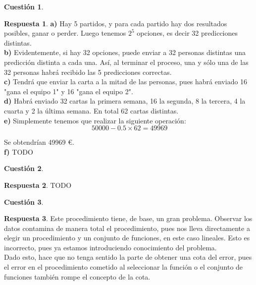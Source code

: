 \documentclass[10pt,a4paper]{article}
\theoremstyle{definition}
\newtheorem{cuestion}{Cuestión}
\newtheorem*{respuesta}{Respuesta}
\begin{document}
\begin{cuestion}
\end{cuestion}
\begin{respuesta}
\textbf{a)}
Hay 5 partidos, y para cada partido hay dos resultados posibles, ganar o perder. Luego tenemos $2^5$ opciones, es decir 32 predicciones distintas.\\

\textbf{b)}
Evidentemente, si hay 32 opciones, puede enviar a 32 personas distintas una predicción distinta a cada una. Así, al terminar el proceso, una y sólo una de las 32 personas habrá recibido las 5 predicciones correctas.\\

\textbf{c)}
Tendrá que enviar la carta a la mitad de las personas, pues habrá enviado 16 "gana el equipo 1" y 16 "gana el equipo 2".\\

\textbf{d)}
Habrá enviado 32 cartas la primera semana, 16 la segunda, 8 la tercera, 4 la cuarta y 2 la última semana. En total 62 cartas distintas.\\

\textbf{e)}
Simplemente tenemos que realizar la siguiente operación:\\

\[
\ 50000 - 0.5 \times 62 = 49969
\]

Se obtendrían 49969 \euro.\\

\textbf{f)}
TODO\\

\end{respuesta}

\begin{cuestion}
\end{cuestion}
\begin{respuesta}
TODO
\end{respuesta}

\begin{cuestion}
\end{cuestion}
\begin{respuesta}
Este procedimiento tiene, de base, un gran problema. Observar los datos contamina de manera total el procedimiento, pues nos lleva directamente a elegir un procedimiento y un conjunto de funciones, en este caso lineales. Esto es incorrecto, pues ya estamos introduciendo conocimiento del problema.\\

Dado esto, hace que no tenga sentido la parte de obtener una cota del error, pues el error en el procedimiento cometido al seleccionar la función o el conjunto de funciones también rompe el concepto de la cota.\\
 
\end{respuesta}
\end{document}
